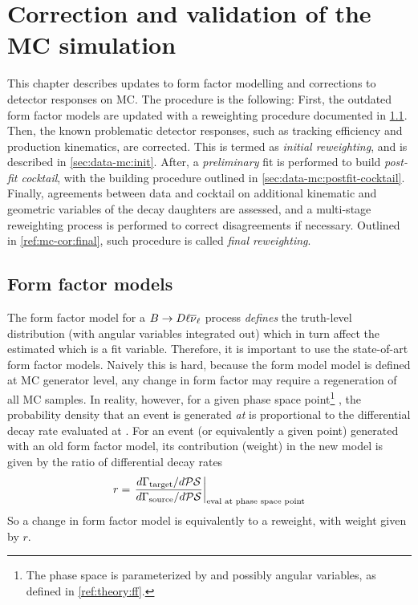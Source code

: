 \chapter{Correction and validation of the MC simulation}
\label{ref:mc-cor}

This chapter describes updates to form factor modelling and corrections to
detector responses on MC.
The procedure is the following:
First, the outdated form factor models are updated with a reweighting
procedure documented in \cref{ref:mc-cor:ff}.
Then, the known problematic detector responses,
such as tracking efficiency and \B production kinematics,
are corrected.
This is termed as \emph{initial reweighting}, and is described in
\cref{sec:data-mc:init}.
After, a \emph{preliminary} fit is performed to build
\emph{post-fit cocktail},
with the building procedure outlined in \cref{sec:data-mc:postfit-cocktail}.
Finally, agreements between data and cocktail on additional kinematic
and geometric variables of the \B decay daughters are assessed,
and a multi-stage reweighting process is
performed to correct disagreements if necessary.
Outlined in \cref{ref:mc-cor:final}, such procedure is called \emph{final
reweighting}.


\section{Form factor models}
\label{ref:mc-cor:ff}

The form factor model for a $B \rightarrow D \ell{\ensuremath{{\overline{\nu}}_\ell}}$ process \emph{defines}
the truth-level \qSq distribution (with angular variables integrated out) which
in turn affect the estimated \qSq which is a fit variable.
Therefore, it is important to use the state-of-art form factor models.
Naively this is hard, because the form model model is defined at MC generator
level, any change in form factor may require a regeneration of all MC samples.
In reality, however, for a given phase space point\footnote{
    The phase space is parameterized by \qSq and possibly angular variables,
    as defined in \cref{ref:theory:ff}.
}  \PSpt, the probability density that an event is generated \emph{at}
\PSpt is proportional to the differential decay rate evaluated at
\PSpt.
For an event (or equivalently a given \PSpt point)
generated with an old form factor model,
its contribution (weight) in the new model is given by the ratio of differential
decay rates
\begin{equation}
    r = \left.
            \frac{d\Gamma_\text{target} / d\mathcal{PS}}{d\Gamma_\text{source} / d\mathcal{PS}}
        \right|_\text{eval at phase space point}
\end{equation}
So a change in form factor model is equivalently to a reweight, with weight given
by $r$.

